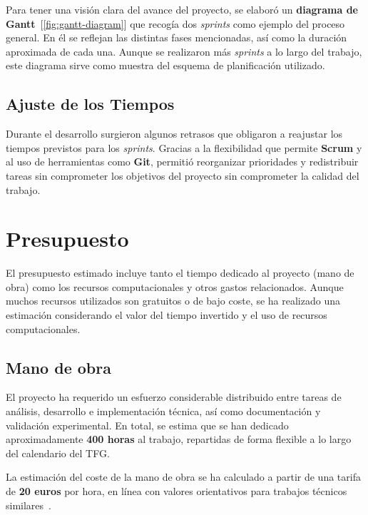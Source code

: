 Para tener una visión clara del avance del proyecto, se elaboró un \textbf{diagrama de Gantt}~[\ref{fig:gantt-diagram}]
que recogía dos \textit{sprints} como ejemplo del proceso general.
En él se reflejan las distintas fases mencionadas, así como la duración aproximada de cada una.
Aunque se realizaron más \textit{sprints} a lo largo del trabajo, este diagrama sirve como muestra del esquema de planificación
utilizado.

\subsection{Ajuste de los Tiempos}\label{subsec:ajuste-de-los-tiempos}
Durante el desarrollo surgieron algunos retrasos que obligaron a reajustar los tiempos previstos para los \textit{sprints}.
Gracias a la flexibilidad que permite \textbf{Scrum} y al uso de herramientas como \textbf{Git},
permitió reorganizar prioridades y redistribuir tareas sin comprometer los objetivos del proyecto sin comprometer la calidad del trabajo.

\section{Presupuesto}\label{sec:presupuesto}
El presupuesto estimado incluye tanto el tiempo dedicado al proyecto (mano de obra) como los recursos computacionales y
otros gastos relacionados.
Aunque muchos recursos utilizados son gratuitos o de bajo coste, se ha realizado una estimación considerando el valor
del tiempo invertido y el uso de recursos computacionales.

\subsection{Mano de obra}\label{subsec:mano-de-obra}
El proyecto ha requerido un esfuerzo considerable distribuido entre tareas de análisis, desarrollo e implementación técnica,
así como documentación y validación experimental.
En total, se estima que se han dedicado aproximadamente \textbf{400 horas} al trabajo, repartidas de forma flexible a lo largo del calendario del TFG.

La estimación del coste de la mano de obra se ha calculado a partir de una tarifa de \textbf{20 euros} por hora,
en línea con valores orientativos para trabajos técnicos similares~\cite{SalarioParaData}.

